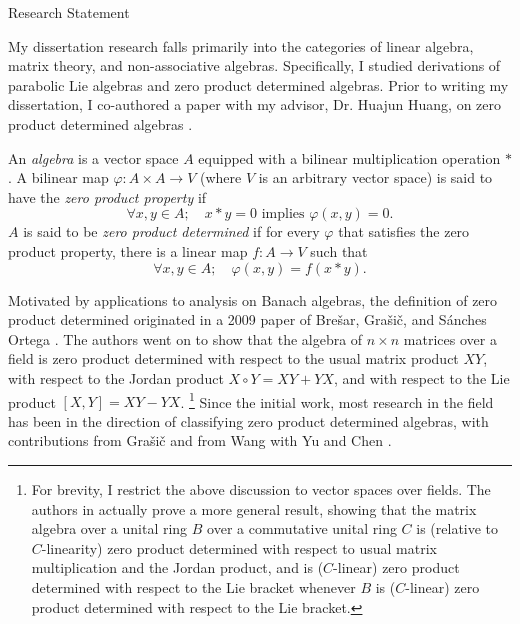 \documentclass[11pt]{article}
\begin{document}

\begin{center}
\huge Research Statement
\end{center}

\vfill

My dissertation research falls primarily into the categories of linear algebra, matrix theory, and non-associative algebras. Specifically, I studied derivations of parabolic Lie algebras and zero product determined algebras. Prior to writing my dissertation, I co-authored a paper with my advisor, Dr. Huajun Huang, on zero product determined algebras \cite{brice2015zero}.



An \emph{algebra} is a vector space $A$ equipped with a bilinear multiplication operation $\ast$. A bilinear map $\varphi : A \times A \to V$ (where $V$ is an arbitrary vector space) is said to have the \emph{zero product property} if
$$\forall x, y \in A;\quad x \ast y = 0 \text{ implies } \varphi(x,y) = 0.$$
$A$ is said to be \emph{zero product determined} if for every $\varphi$ that satisfies the zero product property, there is a linear map $f : A \to V$ such that
$$\forall x, y \in A;\quad \varphi(x,y) = f(x \ast y).$$

Motivated by applications to analysis on Banach algebras, the definition of zero product determined originated in a 2009 paper of Bre\v{s}ar, Gra\v{s}i\v{c}, and S\'{a}nches Ortega \cite{brevsar2009zero}. The authors went on to show that the algebra of $n \times n$ matrices over a field is zero product determined with respect to the usual matrix product $XY$, with respect to the Jordan product $X \circ Y = XY + YX$, and with respect to the Lie product $[X,Y] = XY - YX$. \footnote{For brevity, I restrict the above discussion to vector spaces over fields. The authors in \cite{brevsar2009zero} actually prove a more general result, showing that the matrix algebra over a unital ring $B$ over a commutative unital ring $C$ is (relative to $C$-linearity) zero product determined with respect to usual matrix multiplication and the Jordan product, and is ($C$-linear) zero product determined with respect to the Lie bracket whenever $B$ is ($C$-linear) zero product determined with respect to the Lie bracket.} Since the initial work, most research in the field has been in the direction of classifying zero product determined algebras, with contributions from Gra\v{s}i\v{c} \cite{gravsivc2010zero} and from Wang with Yu and Chen \cite{wang2011class}.
\end{document}
